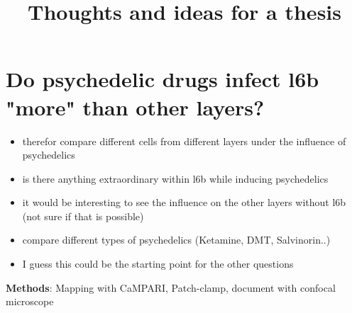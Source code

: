 \documentclass[12pt, a4paper, openany]{article}
\title{
  {\textbf{Thoughts and ideas for a thesis}}\\
}
\begin{document}
\maketitle

\section{Do psychedelic drugs infect l6b "more" than other layers?}
\begin{itemize}
\setlength\itemsep{0em}
\item therefor compare different cells from different layers under the influence of psychedelics 
\item is there anything extraordinary within l6b while inducing psychedelics
\item it would be interesting to see the influence on the other layers without l6b (not sure if that is possible)
\item compare different types of psychedelics (Ketamine, DMT, Salvinorin..)
\item I guess this could be the starting point for the other questions 
\end{itemize}
\textbf{Methods}:  Mapping with CaMPARI, Patch-clamp, document with confocal microscope
\end{document}

